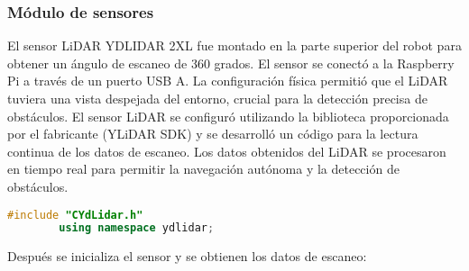     \subsubsection{M\'odulo de sensores}
    El sensor LiDAR YDLIDAR 2XL fue montado en la parte superior del robot para obtener
        un \'angulo de escaneo de 360 grados. El sensor se conect\'o a la Raspberry Pi a trav\'es de
        un puerto USB A. La configuraci\'on f\'isica permiti\'o que el LiDAR tuviera una vista
        despejada del entorno, crucial para la detecci\'on precisa de obst\'aculos.
    \vskip 0.5cm
    El sensor LiDAR se configur\'o utilizando la biblioteca proporcionada por el fabricante
        (YLiDAR SDK) y se desarroll\'o un c\'odigo para la lectura continua de los datos de escaneo.
        Los datos obtenidos del LiDAR se procesaron en tiempo real para permitir la
        navegaci\'on aut\'onoma y la detecci\'on de obst\'aculos.
    \vskip 0.5cm
    \begin{lstlisting}[language={C++}, caption={Primero se implementa la librer\'ia del LiDAR}, label={Script}]
        #include "CYdLidar.h"
        using namespace ydlidar;
    \end{lstlisting}
    \vskip 0.5cm
    Despu\'es se inicializa el sensor y se obtienen los datos de escaneo:
    \vskip 0.5cm

